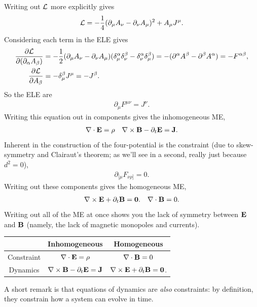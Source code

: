 \documentclass[11pt]{article}
\begin{document}
\begin{dderivation}
    Writing out $\mathcal{L}$ more explicitly gives
    \begin{align*}
        \mathcal{L} = - \frac{1}{4} (\partial_\mu A_\nu - \partial_\nu A_\mu)^2 + A_\mu J^\mu.
    \end{align*}
    Considering each term in the ELE gives
    \begin{align*}
        \frac{\partial \mathcal{L}}{\partial (\partial_\alpha A_\beta)} & = - \frac{1}{2} (\partial_\mu A_\nu - \partial_\nu A_\mu) 
        (\delta^\alpha_\mu \delta^\beta_\nu - \delta^\alpha_\nu \delta^\beta_\mu)
        = - (\partial^\alpha A^\beta - \partial^\beta A^\alpha) = - F^{\alpha \beta},\\
        \frac{\partial \mathcal{L}}{\partial A_\beta} & = - \delta^\beta_\mu J^\mu = - J^\beta.
    \end{align*}
    So the ELE are
    \begin{align*}
        \boxed{\partial_\mu F^{\mu \nu} = J^\nu.}
    \end{align*}
    Writing this equation out in components gives the inhomogeneous ME,
    \begin{align*}
        & \nabla \cdot \mathbf{E} = \rho 
        & \nabla \times \mathbf{B} - \partial_t \mathbf{E} = \mathbf{J}.
    \end{align*}
    Inherent in the construction of the four-potential is the constraint
    (due to skew-symmetry and Clairaut's theorem;
    as we'll see in a second, really just because $d^2 = 0$),
    \begin{align*}
        \partial_{[\mu} F_{\nu \rho]} = 0.
    \end{align*}
    Writing out these components gives the homogeneous ME,
    \begin{align*}
        & \nabla \times \mathbf{E} + \partial_t \mathbf{B} = \mathbf{0}.
        & \nabla \cdot \mathbf{B} = 0.
    \end{align*}
    Writing out all of the ME at once shows you the lack
    of symmetry between $\mathbf{E}$ and $\mathbf{B}$ (namely, the lack of
    magnetic monopoles and currents).
    \begin{table}[H]
        \centering
        \begin{tabular}{|c|c|c|}
            \hline
            & Inhomogeneous & Homogeneous\\
            \hline
            Constraint & $\nabla \cdot \mathbf{E} = \rho$ & $\nabla \cdot \mathbf{B} = 0$\\
            Dynamics & $\nabla \times \mathbf{B} - \partial_t \mathbf{E} = \mathbf{J}$ & $\nabla \times \mathbf{E} + \partial_t \mathbf{B} = \mathbf{0}$.\\
            \hline
        \end{tabular}
    \end{table}
    \noin
    A short remark is that equations of dynamics are \emph{also}
    constraints: by definition, they constrain how a system can evolve in time.\\


\end{dderivation}
\end{document}
